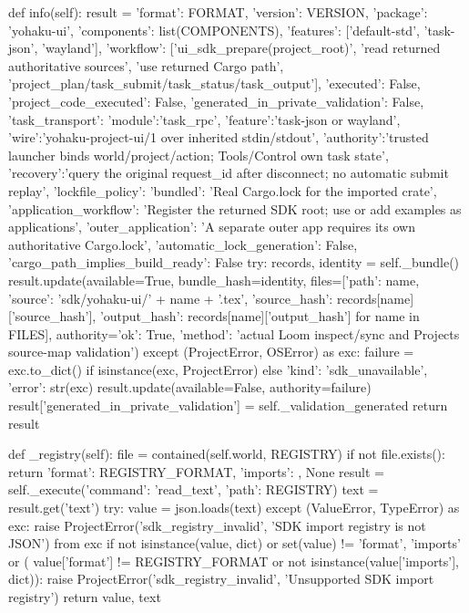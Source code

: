     def info(self):
        result = {'format': FORMAT, 'version': VERSION, 'package': 'yohaku-ui',
                  'components': list(COMPONENTS), 'features': ['default-std', 'task-json', 'wayland'],
                  'workflow': ['ui_sdk_prepare(project_root)', 'read returned authoritative sources',
                               'use returned Cargo path', 'project_plan/task_submit/task_status/task_output'],
                  'executed': False, 'project_code_executed': False,
                  'generated_in_private_validation': False,
                  'task_transport': {'module':'task_rpc', 'feature':'task-json or wayland',
                      'wire':'yohaku-project-ui/1 over inherited stdin/stdout',
                      'authority':'trusted launcher binds world/project/action; Tools/Control own task state',
                      'recovery':'query the original request_id after disconnect; no automatic submit replay'},
                  'lockfile_policy': {'bundled': 'Real Cargo.lock for the imported crate',
                      'application_workflow': 'Register the returned SDK root; use or add examples as applications',
                      'outer_application': 'A separate outer app requires its own authoritative Cargo.lock',
                      'automatic_lock_generation': False, 'cargo_path_implies_build_ready': False}}
        try:
            records, identity = self._bundle()
            result.update(available=True, bundle_hash=identity,
                          files=[{'path': name, 'source': 'sdk/yohaku-ui/' + name + '.tex',
                                  'source_hash': records[name]['source_hash'], 'output_hash': records[name]['output_hash']}
                                 for name in FILES],
                          authority={'ok': True, 'method': 'actual Loom inspect/sync and Projects source-map validation'})
        except (ProjectError, OSError) as exc:
            failure = exc.to_dict() if isinstance(exc, ProjectError) else {'kind': 'sdk_unavailable', 'error': str(exc)}
            result.update(available=False, authority=failure)
        result['generated_in_private_validation'] = self._validation_generated
        return result

    def _registry(self):
        file = contained(self.world, REGISTRY)
        if not file.exists():
            return {'format': REGISTRY_FORMAT, 'imports': {}}, None
        result = self._execute({'command': 'read_text', 'path': REGISTRY})
        text = result.get('text')
        try:
            value = json.loads(text)
        except (ValueError, TypeError) as exc:
            raise ProjectError('sdk_registry_invalid', 'SDK import registry is not JSON') from exc
        if not isinstance(value, dict) or set(value) != {'format', 'imports'} or (
                value['format'] != REGISTRY_FORMAT or not isinstance(value['imports'], dict)):
            raise ProjectError('sdk_registry_invalid', 'Unsupported SDK import registry')
        return value, text

